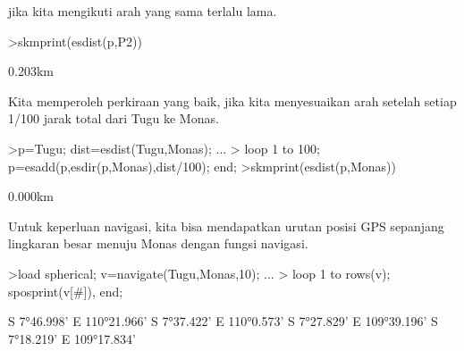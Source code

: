 \documentclass[a4paper,10pt]{article}
\begin{document}
\begin{eulernotebook}
\begin{eulercomment}
\begin{eulercomment}
\begin{eulercomment}
\begin{eulercomment}
\begin{eulercomment}
\begin{eulercomment}
\begin{eulercomment}
\begin{eulercomment}
\begin{eulercomment}
\begin{eulercomment}
\begin{eulercomment}
\begin{eulercomment}
\begin{eulercomment}
\begin{eulercomment}
\begin{eulercomment}
\begin{eulercomment}
\begin{eulercomment}
\begin{eulercomment}
\begin{eulercomment}
\begin{eulercomment}
\begin{eulercomment}
\begin{eulercomment}
\begin{eulercomment}
\begin{eulercomment}
\begin{eulercomment}
\begin{eulercomment}
\begin{eulercomment}
\begin{eulercomment}
\begin{eulercomment}
\begin{eulercomment}
\begin{eulercomment}
\begin{eulercomment}
\begin{eulercomment}
\begin{eulercomment}
\begin{eulercomment}
\begin{eulercomment}
\begin{eulercomment}
\begin{eulercomment}
\begin{eulercomment}
\begin{eulercomment}
\begin{eulercomment}
\begin{eulercomment}
\begin{eulercomment}
jika kita mengikuti arah yang sama terlalu lama.
\end{eulercomment}
\begin{eulerprompt}
>skmprint(esdist(p,P2))
\end{eulerprompt}
\begin{euleroutput}
       0.203km
\end{euleroutput}
\begin{eulercomment}
Kita memperoleh perkiraan yang baik, jika kita menyesuaikan arah
setelah setiap 1/100 jarak total dari Tugu ke Monas.
\end{eulercomment}
\begin{eulerprompt}
>p=Tugu; dist=esdist(Tugu,Monas); ...
>  loop 1 to 100; p=esadd(p,esdir(p,Monas),dist/100); end;
>skmprint(esdist(p,Monas))
\end{eulerprompt}
\begin{euleroutput}
       0.000km
\end{euleroutput}
\begin{eulercomment}
Untuk keperluan navigasi, kita bisa mendapatkan urutan posisi GPS
sepanjang lingkaran besar menuju Monas dengan fungsi navigasi.
\end{eulercomment}
\begin{eulerprompt}
>load spherical; v=navigate(Tugu,Monas,10); ...
>  loop 1 to rows(v); sposprint(v[#]), end;
\end{eulerprompt}
\begin{euleroutput}
  S 7°46.998' E 110°21.966'
  S 7°37.422' E 110°0.573'
  S 7°27.829' E 109°39.196'
  S 7°18.219' E 109°17.834'

\end{euleroutput}
\end{eulercomment}
\end{eulercomment}
\end{eulercomment}
\end{eulercomment}
\end{eulercomment}
\end{eulercomment}
\end{eulercomment}
\end{eulercomment}
\end{eulercomment}
\end{eulercomment}
\end{eulercomment}
\end{eulercomment}
\end{eulercomment}
\end{eulercomment}
\end{eulercomment}
\end{eulercomment}
\end{eulercomment}
\end{eulercomment}
\end{eulercomment}
\end{eulercomment}
\end{eulercomment}
\end{eulercomment}
\end{eulercomment}
\end{eulercomment}
\end{eulercomment}
\end{eulercomment}
\end{eulercomment}
\end{eulercomment}
\end{eulercomment}
\end{eulercomment}
\end{eulercomment}
\end{eulercomment}
\end{eulercomment}
\end{eulercomment}
\end{eulercomment}
\end{eulercomment}
\end{eulercomment}
\end{eulercomment}
\end{eulercomment}
\end{eulercomment}
\end{eulercomment}
\end{eulercomment}
\end{eulernotebook}
\end{document}

